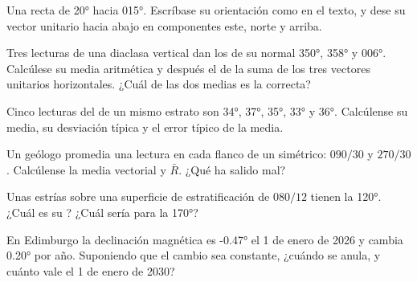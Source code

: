 \begin{exercise}[$\star$]\label{exo:b1:field-lab-methods-1:3}
Una recta de  \ang{20} hacia \ang{015}. Escríbase su orientación como en el texto, y dese su
vector unitario hacia abajo en componentes este, norte y arriba.
\end{exercise}

\begin{exercise}[$\star$]\label{exo:b1:field-lab-methods-1:4}
Tres lecturas de una diaclasa vertical dan los  de su normal \ang{350}, \ang{358} y \ang{006}.
Calcúlese su media aritmética y después el  de la suma de los tres vectores unitarios horizontales.
¿Cuál de las dos medias es la correcta?
\end{exercise}

\begin{exercise}[$\star\star$]\label{exo:b1:field-lab-methods-1:5}
Cinco lecturas del  de un mismo estrato son \ang{34}, \ang{37}, \ang{35}, \ang{33} y \ang{36}.
Calcúlense su media, su desviación típica y el error típico de la media.
\end{exercise}

\begin{exercise}[$\star\star$]\label{exo:b1:field-lab-methods-1:6}
Un geólogo promedia una lectura en cada flanco de un  simétrico: $090/30$ y $270/30$.
Calcúlense la media vectorial y $\bar R$. ¿Qué ha salido mal?
\end{exercise}

\begin{exercise}[$\star\star$]\label{exo:b1:field-lab-methods-1:7}
Unas estrías sobre una superficie de estratificación de  $080/12$ tienen la 
\ang{120}. ¿Cuál es su ? ¿Cuál sería para la  \ang{170}?
\end{exercise}

\begin{exercise}[$\star\star$]\label{exo:b1:field-lab-methods-1:8}
En Edimburgo la declinación magnética es \ang{-0.47} el 1 de enero de 2026 y cambia \ang{+0.20} por año.
Suponiendo que el cambio sea constante, ¿cuándo se anula, y cuánto vale el 1 de enero de 2030?
\end{exercise}

